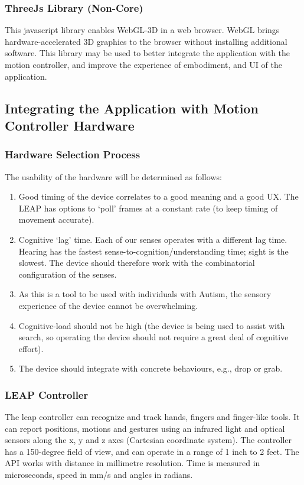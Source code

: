 \documentclass[10pt]{article}
\begin{document}
\subsubsection{ThreeJs Library (Non-Core)}
This javascript library enables WebGL-3D in a web browser. WebGL brings hardware-accelerated 3D graphics to the browser without installing additional software. This library may be used to better integrate the application with the motion controller, and improve the experience of embodiment, and UI of the application.


\subsection{Integrating the Application with Motion Controller Hardware }\label{hardware}
\subsubsection{Hardware Selection Process}
The usability of the hardware will be determined as follows: 
\begin{enumerate}
\item Good timing of the device correlates to a good meaning and a good UX. The LEAP has options to ‘poll’ frames at a constant rate (to keep timing of movement accurate).
\item Cognitive ‘lag’ time. Each of our senses operates with a different lag time. Hearing has the fastest sense-to-cognition/understanding time; sight is the slowest. The device should therefore work with the combinatorial configuration of the senses.
\item As this is a tool to be used with individuals with Autism, the sensory experience of the device cannot be overwhelming.
\item Cognitive-load should not be high (the device is being used to assist with search, so operating the device should not require a great deal of cognitive effort).
\item The device should integrate with concrete behaviours, e.g., drop or grab. 

\end{enumerate}

\subsubsection{LEAP Controller}
The leap controller can recognize and track hands, fingers and finger-like tools. It can report positions, motions and gestures using an infrared light and optical sensors along the x, y and z axes (Cartesian coordinate system). The controller has a 150-degree field of view, and can operate in a range of 1 inch to 2 feet. The API works with distance in millimetre resolution. Time is measured in microseconds, speed in mm/s and angles in radians.
\end{document}
